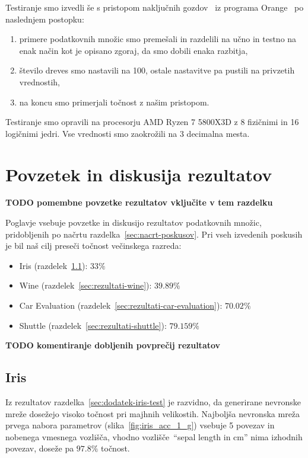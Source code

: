 \documentclass[a4paper,12pt,openright]{book}
\begin{document}
    Testiranje smo izvedli še s pristopom naključnih gozdov~\cite{inteligentni_sistemi_2010} iz programa Orange~\cite{JMLR:demsar13a} po naslednjem postopku:
    \begin{enumerate}
        \item primere podatkovnih množic smo premešali in razdelili na učno in testno na enak način kot je opisano zgoraj,
        da smo dobili enaka razbitja,
        \item število dreves smo nastavili na 100, ostale nastavitve pa pustili na privzetih vrednostih,
        \item na koncu smo primerjali točnost z našim pristopom.
    \end{enumerate}

    Testiranje smo opravili na procesorju AMD Ryzen 7 5800X3D z 8 fizičnimi in 16 logičnimi jedri.
    Vse vrednosti smo zaokrožili na 3 decimalna mesta.


    \chapter{Povzetek in diskusija rezultatov}\label{ch:rezultati}
    \textbf{TODO pomembne povzetke rezultatov vključite v tem razdelku}

    Poglavje vsebuje povzetke in diskusijo rezultatov podatkovnih množic, pridobljenih po načrtu razdelka~\ref{sec:nacrt-poskusov}.
    Pri vseh izvedenih poskusih je bil naš cilj preseči točnost večinskega razreda:
    \begin{itemize}
        \item{Iris (razdelek~\ref{sec:rezultati-iris}): $33\%$}
        \item{Wine (razdelek~\ref{sec:rezultati-wine}): $39.89\%$}
        \item{Car Evaluation (razdelek~\ref{sec:rezultati-car-evaluation}): $70.02\%$}
        \item{Shuttle (razdelek~\ref{sec:rezultati-shuttle}): $79.159\%$}
    \end{itemize}

    \textbf{TODO komentiranje dobljenih povprečij rezultatov}

    \section{Iris}\label{sec:rezultati-iris}
    Iz rezultatov razdelka~\ref{sec:dodatek-iris-test} je razvidno, da generirane nevronske mreže do\-se\-že\-jo visoko točnost pri majhnih velikostih.
    Najboljša nevronska mreža prvega nabora parametrov (slika~\ref{fig:iris_acc_1_g}) vsebuje 5 povezav in nobenega vmesnega vozlišča,
    vhodno vozlišče~\enquote{sepal length in cm} nima izhodnih povezav, doseže pa $97.8\%$ točnost.
\end{document}
